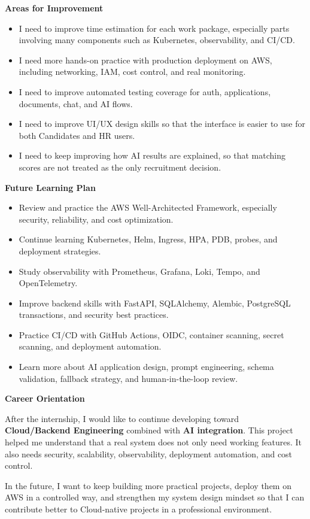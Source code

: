 \vspace{0.5em}\noindent\textbf{Areas for Improvement}\par

\begin{itemize}
\tightlist
\item
  I need to improve time estimation for each work package, especially
  parts involving many components such as Kubernetes, observability, and
  CI/CD.
\item
  I need more hands-on practice with production deployment on AWS,
  including networking, IAM, cost control, and real monitoring.
\item
  I need to improve automated testing coverage for auth, applications,
  documents, chat, and AI flows.
\item
  I need to improve UI/UX design skills so that the interface is easier
  to use for both Candidates and HR users.
\item
  I need to keep improving how AI results are explained, so that
  matching scores are not treated as the only recruitment decision.
\end{itemize}

\vspace{0.5em}\noindent\textbf{Future Learning Plan}\par

\begin{itemize}
\tightlist
\item
  Review and practice the AWS Well-Architected Framework, especially
  security, reliability, and cost optimization.
\item
  Continue learning Kubernetes, Helm, Ingress, HPA, PDB, probes, and
  deployment strategies.
\item
  Study observability with Prometheus, Grafana, Loki, Tempo, and
  OpenTelemetry.
\item
  Improve backend skills with FastAPI, SQLAlchemy, Alembic, PostgreSQL
  transactions, and security best practices.
\item
  Practice CI/CD with GitHub Actions, OIDC, container scanning, secret
  scanning, and deployment automation.
\item
  Learn more about AI application design, prompt engineering, schema
  validation, fallback strategy, and human-in-the-loop review.
\end{itemize}

\vspace{0.5em}\noindent\textbf{Career Orientation}\par

After the internship, I would like to continue developing toward
\textbf{Cloud/Backend Engineering} combined with \textbf{AI
integration}. This project helped me understand that a real system does
not only need working features. It also needs security, scalability,
observability, deployment automation, and cost control.

In the future, I want to keep building more practical projects, deploy
them on AWS in a controlled way, and strengthen my system design mindset
so that I can contribute better to Cloud-native projects in a
professional environment.
